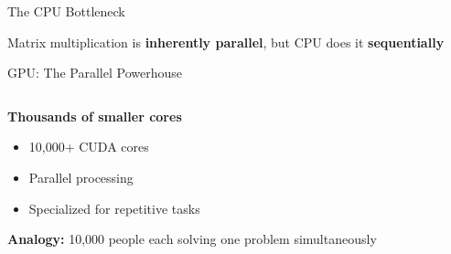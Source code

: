\documentclass[10pt]{beamer}
\begin{document}
\begin{frame}{The CPU Bottleneck}
  \begin{center}
  \end{center}
  
  \vspace{1em}
  \centering
  Matrix multiplication is \textbf{inherently parallel}, but CPU does it \textbf{sequentially}
\end{frame}

\begin{frame}{GPU: The Parallel Powerhouse}
  \begin{columns}[T]
    \begin{column}{0.5\textwidth}
      \textbf{Thousands of smaller cores}
      \begin{itemize}
        \item 10,000+ CUDA cores
        \item Parallel processing
        \item Specialized for repetitive tasks
      \end{itemize}
      
      \vspace{1em}
      \textbf{Analogy:} 10,000 people each solving one problem simultaneously
    \end{column}
    \begin{column}{0.5\textwidth}
    \end{column}
  \end{columns}
\end{frame}
\end{document}
